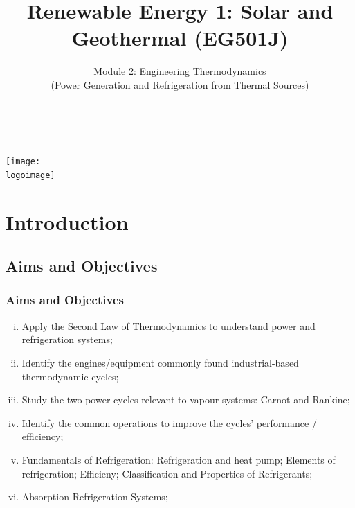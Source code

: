 \documentclass[10pt,compress]{beamer}
\institute{School of Engineering}
\title{Renewable Energy 1: Solar and Geothermal (EG501J)}
\subtitle{Module 2: Engineering Thermodynamics \\ (Power Generation and Refrigeration from Thermal Sources)}
\date[]{}
\author[\shortname]{%
  \fullname\\\ttfamily{\emailaddress}
}
\newcommand{\logoimage}{../FigBanner/UoAHorizBanner}
\begin{document}
\begin{frame}
  \titlepage
  \vfill%
  \begin{center}
    \texttt{[image: \\logoimage]}
  \end{center}
\end{frame}





\section{Introduction}

 \subsection{Aims and Objectives}
   \begin{frame}
     \frametitle{Aims and Objectives}
     \begin{enumerate}[(i)]
       \item <1-> Apply the Second Law of Thermodynamics to understand power and refrigeration systems;
       \item <1-> Identify the engines/equipment commonly found industrial-based thermodynamic cycles; 
       \item <1-> Study the two power cycles relevant to vapour systems: Carnot and Rankine; 
       \item <1-> Identify the common operations to improve the cycles' performance / efficiency;
       \item <1-> Fundamentals of Refrigeration: Refrigeration and heat pump; Elements of refrigeration; Efficieny; Classification and Properties of Refrigerants;
       \item <1-> Absorption Refrigeration Systems;
 \end{enumerate}
   \end{frame}
\end{document}
